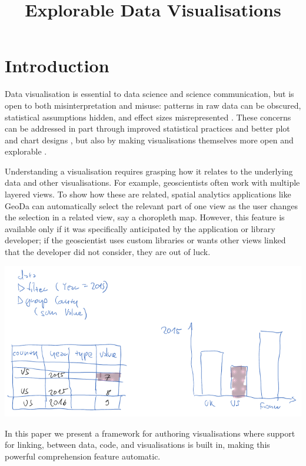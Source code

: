 \documentclass{vgtc}
\title{Explorable Data Visualisations}
\begin{document}
\maketitle

\section{Introduction}

Data visualisation is essential to data science and science communication, but
is open to both misinterpretation and misuse: patterns in raw data can be
obscured, statistical assumptions hidden, and effect sizes misrepresented
\cite{weissgerber15}. These concerns can be addressed in part through improved
statistical practices and better plot and chart designs \cite{allen19}, but also
by making visualisations themselves more open and explorable
\cite{dragicevic19}.

Understanding a visualisation requires grasping how it relates to the underlying
data and other visualisations. For example, geoscientists often work with
multiple layered views. To show how these are related, spatial analytics
applications like GeoDa \cite{anselin06} can automatically select the relevant
part of one view as the user changes the selection in a related view, say a
choropleth map. However, this feature is available only if it was specifically
anticipated by the application or library developer; if the geoscientist uses
custom libraries or wants other views linked that the developer did not
consider, they are out of luck.

\includegraphics[scale=0.35]{image/chart-fwd}

In this paper we present a framework for authoring visualisations where support
for linking, between data, code, and visualisations is built in, making this
powerful comprehension feature automatic.
\end{document}
